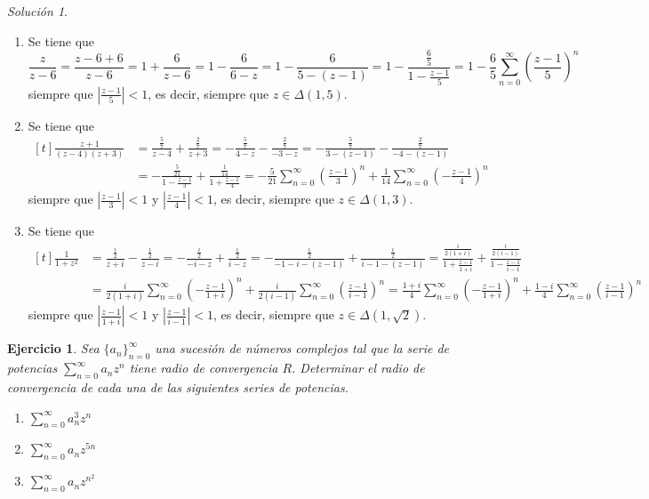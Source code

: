\documentclass[11pt]{report}
\newcommand{\serie}[2][0]{\sum_{n=#1}^\infty #2}
\newtheorem{exercise}{Ejercicio}
\theoremstyle{remark}
\newtheorem*{resolution}{Solución}
\begin{document}
\begin{resolution}
\hfill
\begin{enumerate}
    \item Se tiene que
    \[\frac{z}{z-6} = \frac{z-6+6}{z-6} = 1+\frac{6}{z-6} = 1-\frac{6}{6-z} =  1-\frac{6}{5-(z-1)} = 1-\frac{\frac{6}{5}}{1-\frac{z-1}{5}} = 1-\frac{6}{5}\serie{\left(\frac{z-1}{5}\right)^n}\]
    siempre que $|\frac{z-1}{5}| < 1$, es decir, siempre que $z \in \Delta(1,5)$.
    \item Se tiene que
    \[\begin{aligned}[t]
        \frac{z+1}{(z-4)(z+3)} &= \frac{\frac{5}{7}}{z-4}+\frac{\frac{2}{7}}{z+3} = -\frac{\frac{5}{7}}{4-z}-\frac{\frac{2}{7}}{-3-z} = -\frac{\frac{5}{7}}{3-(z-1)}-\frac{\frac{2}{7}}{-4-(z-1)} \\
        &= -\frac{\frac{5}{21}}{1-\frac{z-1}{3}}+\frac{\frac{1}{14}}{1+\frac{z-1}{4}} = -\frac{5}{21}\serie{\left(\frac{z-1}{3}\right)^n}+\frac{1}{14}\serie{\left(-\frac{z-1}{4}\right)^n}
    \end{aligned}\]
    siempre que $|\frac{z-1}{3}|<1$ y $|\frac{z-1}{4}|<1$, es decir, siempre que $z \in \Delta(1,3)$.
    \item Se tiene que
    \[
    \begin{aligned}[t]
    \frac{1}{1+z^2} &= \frac{\frac{i}{2}}{z+i}-\frac{\frac{i}{2}}{z-i} = -\frac{\frac{i}{2}}{-i-z}+\frac{\frac{i}{2}}{i-z} = -\frac{\frac{i}{2}}{-1-i-(z-1)}+\frac{\frac{i}{2}}{i-1-(z-1)}
    = \frac{\frac{i}{2(1+i)}}{1+\frac{z-1}{1+i}}+\frac{\frac{i}{2(i-1)}}{1-\frac{z-1}{i-1}} \\ &= \frac{i}{2(1+i)}\serie{\left(-\frac{z-1}{1+i}\right)^n}+\frac{i}{2(i-1)}\serie{\left(\frac{z-1}{i-1}\right)^n} = \frac{1+i}{4}\serie{\left(-\frac{z-1}{1+i}\right)^n}+\frac{1-i}{4}\serie{\left(\frac{z-1}{i-1}\right)^n}
    \end{aligned}
    \]
    siempre que $|\frac{z-1}{1+i}|<1$ y $|\frac{z-1}{i-1}|<1$, es decir, siempre que $z \in \Delta(1,\sqrt{2})$.
\end{enumerate}
\end{resolution}

\begin{exercise}
Sea $\{a_n\}_{n=0}^\infty$ una sucesión de números complejos tal que la serie de potencias $\sum_{n=0}^\infty a_nz^n$ tiene radio de convergencia $R$. Determinar el radio de convergencia de cada una de las siguientes series de potencias.
\begin{enumerate}
    \item $\displaystyle\sum_{n=0}^\infty a^3_nz^n$
    \item $\displaystyle\sum_{n=0}^\infty a_nz^{5n}$
    \item $\displaystyle\sum_{n=0}^\infty a_nz^{n^2}$
\end{enumerate}
\end{exercise}
\end{document}

